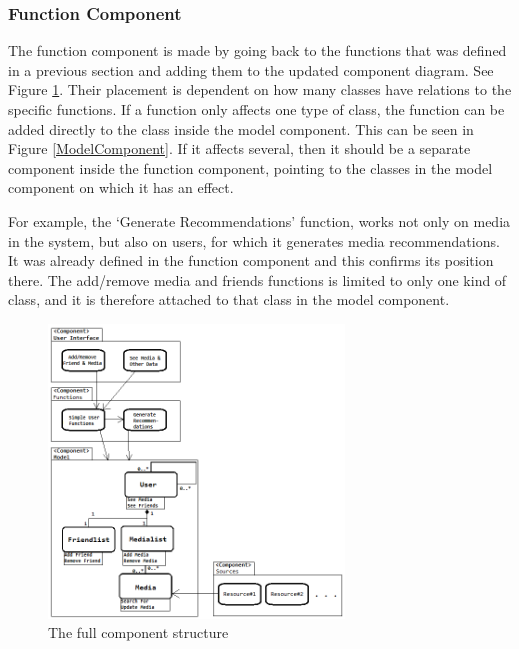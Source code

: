 \subsubsection{Function Component}

The function component is made by going back to the functions that was defined in a previous section and adding them to the updated component diagram. See Figure \ref{FullComponents}. Their placement is dependent on how many classes have relations to the specific functions. If a function only affects one type of class, the function can be added directly to the class inside the model component. This can be seen in Figure \ref{ModelComponent}. If it affects several, then it should be a separate component inside the function component, pointing to the classes in the model component on which it has an effect.

For example, the ‘Generate Recommendations’ function, works not only on media in the system, but also on users, for which it generates media recommendations. It was already defined in the function component and this confirms its position there. The add/remove media and friends functions is limited to only one kind of class, and it is therefore attached to that class in the model component.

\begin{figure}[htb]
\centering
\includegraphics[width=0.7\textwidth]{Images/FullComponents.png}
\caption{The full component structure}
\label{FullComponents}
\end{figure}